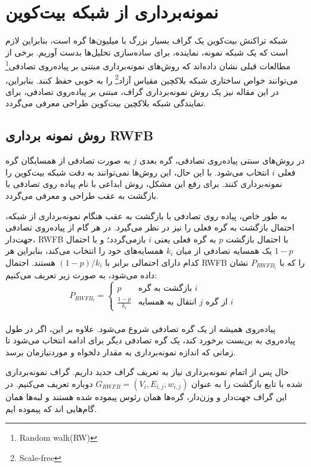 \section{نمونه‌برداری از شبکه بیت‌کوین}

شبکه تراکنش بیت‌کوین یک گراف بسیار بزرگ با میلیون‌ها گره است، بنابراین لازم است که یک شبکه نمونه، نماینده، برای ساده‌سازی تحلیل‌ها بدست آوریم. برخی از مطالعات قبلی نشان داده‌اند که روش‌های نمونه‌برداری مبتنی بر پیاده‌روی تصادفی\footnote{ Random walk(RW)} می‌توانند خواص ساختاری شبکه بلاکچین مقیاس آزاد\footnote{Scale-free} را به خوبی حفظ کنند. بنابراین، در این مقاله نیز یک روش نمونه‌برداری گراف، مبتنی بر پیاده‌روی تصادفی، برای نمایندگی شبکه بلاکچین بیت‌کوین طراحی معرفی می‌گردد.

\subsection{روش نمونه برداری RWFB}
در روش‌های سنتی پیاده‌روی تصادفی، گره بعدی $j$ به صورت تصادفی از همسایگان گره فعلی $i$ انتخاب می‌شود. با این حال، این روش‌ها نمی‌توانند به دقت شبکه بیت‌کوین را نمونه‌برداری کنند. برای رفع این مشکل، روش ابداعی با نام پیاده روی تصادفی با بازگشت به عقب طراحی و معرفی می‌گردد.

به طور خاص، پیاده روی تصادفی با بازگشت به عقب هنگام نمونه‌برداری از شبکه، احتمال بازگشت به گره فعلی را نیز در نظر می‌گیرد. در هر گام از پیاده‌روی تصادفی جهت‌دار، RWFB با احتمال بازگشت $p$ به گره فعلی یعنی $i$ بازمی‌گردد؛ و با احتمال $1 - p$ یک همسایه تصادفی از میان $k_i$ همسایه‌های خود را انتخاب می‌کند، بنابراین هر کدام دارای احتمالی برابر با $(1 - p) / k_i$ هستند. احتمال RWFB را که با $P_{RWFB_i}$ نشان داده می‌شود، به صورت زیر تعریف می‌کنیم:
\[
P_{RWFB_i} = 
\begin{cases} 
p & \text{بازگشت به گره $i$} \\
\frac{1 - p}{k_i} & \text{انتقال به همسایه $j$ از گره $i$ }
\end{cases}
\]
\\
پیاده‌روی همیشه از یک گره تصادفی شروع می‌شود. علاوه بر این، اگر در طول پیاده‌روی به بن‌بست برخورد کند، یک گره تصادفی دیگر برای ادامه انتخاب می‌شود تا زمانی که اندازه نمونه‌برداری به مقدار دلخواه و موردنیازمان برسد.



حال پس از اتمام نمونه‌برداری نیاز به تعریف گراف جدید داریم. گراف نمونه‌برداری شده با تابع بازگشت را به عنوان $G_{RWFB} = (V_i, E_{i,j}, w_{i,j})$ دوباره تعریف می‌کنیم. در این گراف جهت‌دار و وزن‌دار، گره‌ها همان رئوس پیموده شده هستند و لبه‌ها همان گام‌هایی اند که پیموده ایم.


